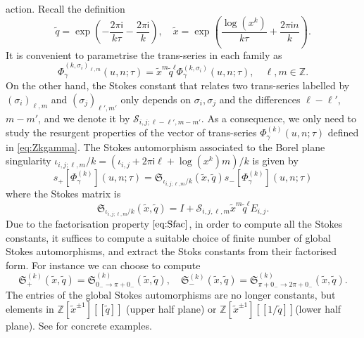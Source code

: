 \documentclass[a4paper,11pt]{article}	%
\def\mc{\mathcal}
\def\mf{\mathfrak}
\def\IZ{\mathbb{Z}}
\def\tq{\tilde{q}}
\def\tx{\tilde{x}}
\newcommand{\ri}{{\mathsf{i}}}
\newcommand{\s}{\sigma}
\begin{document}
action.  Recall the definition
\begin{equation}
  \tq = \exp \left(-\frac{2\pi\ri}{k\tau}- \frac{2\pi\ri}{k}\right),\quad
  \tx = \exp \left(\frac{\log (x^k)}{k\tau} + \frac{2\pi\ri n}{k}\right).
\end{equation}
It is convenient to parametrise the trans-series in each family as
\begin{equation}
  \Phi_\gamma^{(k,\s_i)_{\ell,m}}(u,n;\tau) = \tx^m\tq^\ell
  \Phi_\gamma^{(k,\s_i)}(u,n;\tau),\quad \ell,m\in\IZ.
\end{equation}
On the other hand, the Stokes constant that relates two trans-series
labelled by $(\s_i)_{\ell,m}$ and $(\s_j)_{\ell',m'}$ only depends on
$\s_i,\s_j$ and the differences $\ell-\ell'$, $m-m'$, and we denote it
by $\mc{S}_{i,j;\ell-\ell',m-m'}$. As a consequence, we only need to
study the resurgent properties of the vector of trans-series
$\Phi_\gamma^{(k)}(u,n;\tau)$ defined in \eqref{eq:Zkgamma}.  The Stokes
automorphism associated to the Borel plane singularity
$\iota_{i,j;\ell,m}/k = (\iota_{i,j}+2\pi\ri\ell+\log(x^k)m)/k$ is
given by
\begin{equation}
  s_+[\Phi_\gamma^{(k)}](u,n;\tau) = \mf{S}_{\iota_{i,j;\ell,m}/k}(\tx,\tq)
  s_-[\Phi_\gamma^{(k)}](u,n;\tau)
\end{equation}
where the Stokes matrix is
\begin{equation}
  \mf{S}_{\iota_{i,j;\ell,m}/k}(\tx,\tq) = I +
  \mc{S}_{i,j,\ell,m}\tx^m\tq^\ell E_{i,j}.
\end{equation}
Due to the factorisation property $\eqref{eq:Sfac}$, in order to
compute all the Stokes constants, it suffices to compute a suitable
choice of finite number of global Stokes automorphisms, and extract
the Stoks constants from their factorised form.  For instance we can
choose to compute
\begin{equation}
  \mf{S}^{(k)}_{+}(\tx,\tq) =
  \mf{S}^{(k)}_{0_{-}\rightarrow \pi+0_{-}}
  (\tx,\tq),\quad
  \mf{S}^{(k)}_{-}(\tx,\tq) =
  \mf{S}^{(k)}_{\pi+0_{-}\rightarrow 2\pi+0_{-}}
  (\tx,\tq).
\end{equation}
The entries of the global Stokes automorphisms are no longer
constants, but elements in $\IZ[\tx^{\pm 1}][[\tq]]$ (upper half
plane) or $\IZ[\tx^{\pm 1}][[1/\tq]]$(lower half plane).  See
\cite{Garoufalidis:2021osl,Garoufalidis:2020xec} for concrete
examples.
\end{document}
